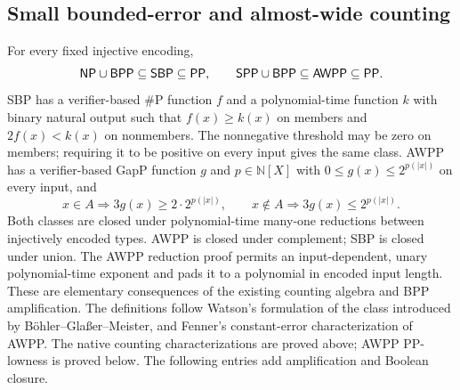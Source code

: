 \begin{result}
\subsection{Small bounded-error and almost-wide counting}
For every fixed injective encoding,
\[
\mathsf{NP}\cup\mathsf{BPP}\subseteq\mathsf{SBP}\subseteq\mathsf{PP},
\qquad
\mathsf{SPP}\cup\mathsf{BPP}\subseteq\mathsf{AWPP}\subseteq\mathsf{PP}.
\]
SBP has a verifier-based \#P function $f$ and a polynomial-time function
$k$ with binary natural output such that $f(x)\geq k(x)$ on members and
$2f(x)<k(x)$ on nonmembers. The nonnegative threshold may be zero on
members; requiring it to be positive on every input gives the same class.
AWPP has a verifier-based GapP function $g$ and $p\in\mathbb{N}[X]$ with
$0\leq g(x)\leq 2^{p(|x|)}$ on every input, and
\[
x\in A\Rightarrow 3g(x)\geq 2\cdot 2^{p(|x|)},\qquad
x\notin A\Rightarrow 3g(x)\leq 2^{p(|x|)}.
\]
Both classes are closed under polynomial-time many-one reductions between
injectively encoded types. AWPP is closed under complement; SBP is closed
under union. The AWPP reduction proof permits an input-dependent, unary
polynomial-time exponent and pads it to a polynomial in encoded input length.
These are elementary consequences of the existing counting algebra and BPP
amplification. The definitions follow Watson's formulation of the class
introduced by B\"ohler--Gla{\ss}er--Meister, and Fenner's constant-error
characterization of AWPP.\citep{BoehlerGlasserMeister2006}
\citep[Definition 2]{Watson2012}\citep{Fenner2003}
The native counting characterizations are proved above; AWPP PP-lowness is proved below.
The following entries add amplification and Boolean closure.

\end{result}
